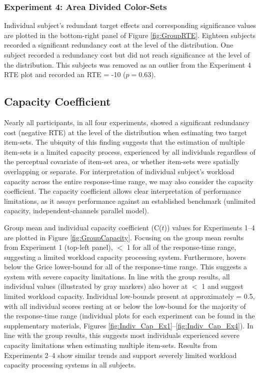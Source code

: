 \subsubsection{Experiment 4: Area Divided Color-Sets}
Individual subject's redundant target effects and corresponding significance values are plotted in the bottom-right panel of Figure \ref{fig:GroupRTE}. Eighteen subjects recorded a significant redundancy cost at the level of the distribution. One subject recorded a redundancy cost but did not reach significance at the level of the distribution. This subjects was removed as an outlier from the Experiment 4 RTE plot and recorded an RTE = -10 ($p = 0.63$). 

\subsection{Capacity Coefficient}
Nearly all participants, in all four experiments, showed a significant redundancy cost (negative RTE) at the level of the distribution when estimating two target item-sets. The ubiquity of this finding suggests that the estimation of multiple item-sets is a limited capacity process, experienced by all individuals regardless of the perceptual covariate of item-set area, or whether item-sets were spatially overlapping or separate. For interpretation of individual subject's workload capacity across the entire response-time range, we may also consider the capacity coefficient. The capacity coefficient allows clear interpretation of performance limitations, as it assays performance against an established benchmark (unlimited capacity, independent-channels parallel model). 

Group mean and individual capacity coefficient (C($t$)) values for Experiments 1--4 are plotted in Figure \ref{fig:GroupCapacity}. Focusing on the group mean \Ct results from Experiment 1 (top-left panel), \Ct $<$ 1 for all of the response-time range, suggesting a limited workload capacity processing system. Furthermore, \Ct hovers below the Grice lower-bound for all of the response-time range. This suggests a system with severe capacity limitations. In line with the group results, all individual \Ct values (illustrated by gray markers) also hover at \Ct $<$ 1 and suggest limited workload capacity. Individual low-bounds present at approximately \Ct = 0.5, with all individual \Ct scores resting at or below the low-bound for the majority of the response-time range (individual \Ct plots for each experiment can be found in the supplementary materials, Figures \ref{fig:Indiv_Cap_Ex1}--\ref{fig:Indiv_Cap_Ex4}). In line with the group results, this suggests most individuals experienced severe capacity limitations when estimating multiple item-sets. Results from Experiments 2--4 show similar trends and support severely limited workload capacity processing systems in all subjects.

